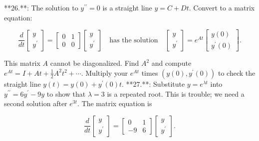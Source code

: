 

**26.**: The solution to \(y^{\prime\prime}=0\) is a straight line \(y=C+Dt\). Convert to a matrix equation:

\[\frac{d}{dt}\begin{bmatrix}y\\ y^{\prime}\end{bmatrix}=\begin{bmatrix}0&1\\ 0&0\end{bmatrix}\begin{bmatrix}y\\ y^{\prime}\end{bmatrix}\quad\text{has the solution}\quad\begin{bmatrix}y\\ y^{\prime}\end{bmatrix}=e^{At}\begin{bmatrix}y(0)\\ y^{\prime}(0)\end{bmatrix}.\]

This matrix \(A\) cannot be diagonalized. Find \(A^{2}\) and compute \(e^{At}=I+At+\frac{1}{2}A^{2}t^{2}+\cdots\). Multiply your \(e^{At}\) times \((y(0),y^{\prime}(0))\) to check the straight line \(y(t)=y(0)+y^{\prime}(0)t\).
**27.**: Substitute \(y=e^{\lambda t}\) into \(y^{\prime\prime}=6y^{\prime}-9y\) to show that \(\lambda=3\) is a repeated root. This is trouble; we need a second solution after \(e^{3t}\). The matrix equation is

\[\frac{d}{dt}\begin{bmatrix}y\\ y^{\prime}\end{bmatrix}=\begin{bmatrix}0&1\\ -9&6\end{bmatrix}\begin{bmatrix}y\\ y^{\prime}\end{bmatrix}.\]

